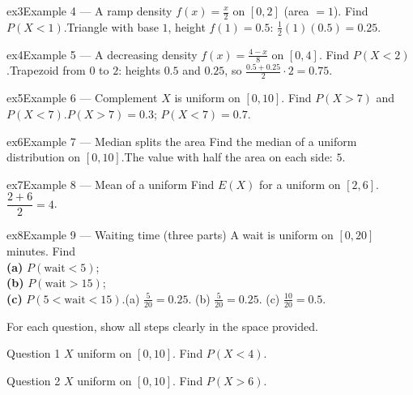 \documentclass[11pt]{article}
\begin{document}
\begin{example}{ex3}{Example 4 --- A ramp density}
$f(x)=\tfrac{x}{2}$ on $[0,2]$ (area $=1$). Find $P(X<1)$.\soln Triangle with base $1$, height $f(1)=0.5$: $\tfrac12(1)(0.5)=0.25$.
\end{example}

\begin{example}{ex4}{Example 5 --- A decreasing density}
$f(x)=\tfrac{4-x}{8}$ on $[0,4]$. Find $P(X<2)$.\soln Trapezoid from $0$ to $2$: heights $0.5$ and $0.25$, so $\tfrac{0.5+0.25}{2}\cdot2=0.75$.
\end{example}

\begin{example}{ex5}{Example 6 --- Complement}
$X$ is uniform on $[0,10]$. Find $P(X>7)$ and $P(X<7)$.\soln $P(X>7)=0.3$; $P(X<7)=0.7$.
\end{example}

\begin{example}{ex6}{Example 7 --- Median splits the area}
Find the median of a uniform distribution on $[0,10]$.\soln The value with half the area on each side: $5$.
\end{example}

\begin{example}{ex7}{Example 8 --- Mean of a uniform}
Find $E(X)$ for a uniform on $[2,6]$.\soln $\dfrac{2+6}{2}=4$.
\end{example}

\begin{example}{ex8}{Example 9 --- Waiting time (three parts)}
A wait is uniform on $[0,20]$ minutes. Find \\ \textbf{(a)} $P(\text{wait}<5)$; \\ \textbf{(b)} $P(\text{wait}>15)$; \\ \textbf{(c)} $P(5<\text{wait}<15)$.\soln (a) $\tfrac{5}{20}=0.25$. (b) $\tfrac{5}{20}=0.25$. (c) $\tfrac{10}{20}=0.5$.
\end{example}

\clearpage
{}
For each question, show all steps clearly in the space provided.

\begin{qbox}{Question 1}
$X$ uniform on $[0,10]$. Find $P(X<4)$.\workspace{2.4cm}
\end{qbox}

\begin{qbox}{Question 2}
$X$ uniform on $[0,10]$. Find $P(X>6)$.\workspace{2.4cm}
\end{qbox}
\end{document}
